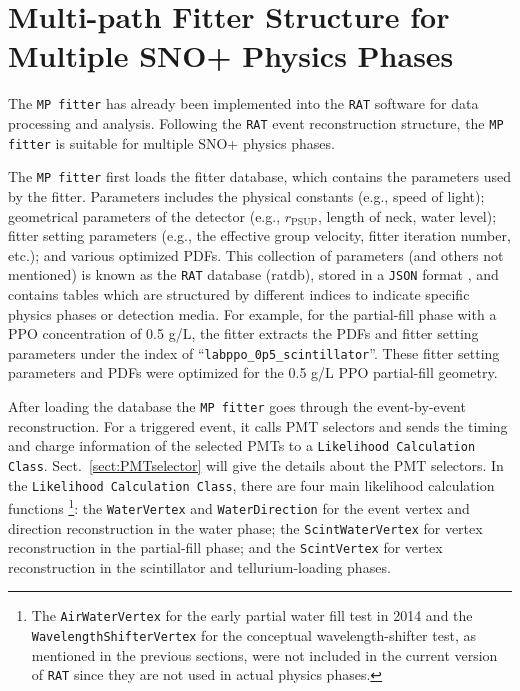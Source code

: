 \section{Multi-path Fitter Structure for Multiple SNO+ Physics Phases}

The \texttt{MP fitter} has already been implemented into the \texttt{RAT} software for data processing and analysis. Following the \texttt{RAT} event reconstruction structure, the \texttt{MP fitter} is suitable for multiple SNO+ physics phases. 

The \texttt{MP fitter} first loads the fitter database, which contains the parameters used by the fitter. Parameters includes the physical constants (e.g., speed of light); geometrical parameters of the detector (e.g., $r_\mathrm{PSUP}$, length of neck, water level); fitter setting parameters (e.g., the effective group velocity, fitter iteration number, etc.); and various optimized PDFs. This collection of parameters (and others not mentioned) is known as the \texttt{RAT} database (ratdb), stored in a \texttt{JSON} format \cite{JSONwiki}, and contains tables which are structured by different indices to indicate specific physics phases or detection media. For example, for the partial-fill phase with a PPO concentration of 0.5 g/L, the fitter extracts the PDFs and fitter setting parameters under the index of ``\texttt{labppo\_0p5\_scintillator}''. These fitter setting parameters and PDFs were optimized for the 0.5 g/L PPO partial-fill geometry.

After loading the database the \texttt{MP fitter} goes through the event-by-event reconstruction. For a triggered event, it calls PMT selectors and sends the timing and charge information of the selected PMTs to a \texttt{Likelihood Calculation Class}. Sect.~\ref{sect:PMTselector} will give the details about the PMT selectors. In the \texttt{Likelihood Calculation Class}, there are four main likelihood calculation functions \footnote{The \texttt{AirWaterVertex} for the early partial water fill test in 2014 and the \texttt{WavelengthShifterVertex} for the conceptual wavelength-shifter test, as mentioned in the previous sections, were not included in the current version of \texttt{RAT} since they are not used in actual physics phases.}: the \texttt{WaterVertex} and \texttt{WaterDirection} for the event vertex and direction reconstruction in the water phase; the \texttt{ScintWaterVertex} for vertex reconstruction in the partial-fill phase; and the \texttt{ScintVertex} for vertex reconstruction in the scintillator and tellurium-loading phases.

